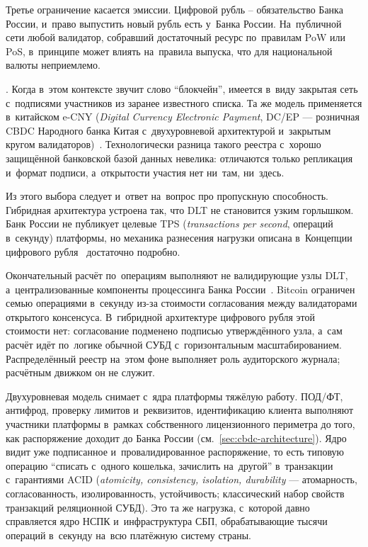 Третье ограничение касается эмиссии. Цифровой рубль -- обязательство
Банка России, и~право выпустить новый рубль есть у~Банка России.
На~публичной сети любой валидатор, собравший достаточный ресурс
по~правилам PoW или PoS, в~принципе может влиять на~правила выпуска,
что для национальной валюты неприемлемо.

. Когда в~этом контексте звучит слово
\enquote{блокчейн}, имеется в~виду закрытая сеть с~подписями участников
из заранее известного списка. Та же модель применяется в~китайском e-CNY (\textit{Digital Currency
Electronic Payment}, DC/EP --- розничная CBDC Народного банка
Китая с~двухуровневой архитектурой и~закрытым кругом
валидаторов)~\cite{pboc-ecny-2021}.
Технологически разница такого реестра с~хорошо защищённой банковской
базой данных невелика: отличаются только репликация
и~формат подписи, а~открытости участия нет ни~там, ни~здесь.

Из этого выбора следует и~ответ на~вопрос про пропускную способность.
Гибридная архитектура устроена так, что DLT не становится узким горлышком.
Банк России не публикует целевые TPS (\textit{transactions per second},
операций в~секунду) платформы, но механика разнесения
нагрузки описана в~Концепции цифрового рубля~\cite{cbr-concept-2021}
достаточно подробно.

Окончательный расчёт по~операциям выполняют не валидирующие
узлы DLT, а~централизованные компоненты процессинга Банка
России~\cite{cbr-concept-2021}. Bitcoin ограничен семью операциями
в~секунду из-за стоимости согласования между валидаторами открытого
консенсуса. В~гибридной архитектуре цифрового рубля этой стоимости
нет: согласование подменено подписью утверждённого узла,
а~сам расчёт идёт по~логике обычной СУБД с~горизонтальным
масштабированием. Распределённый реестр на~этом фоне выполняет роль
аудиторского журнала; расчётным движком он не служит.

Двухуровневая модель снимает с~ядра платформы тяжёлую работу. ПОД/ФТ,
антифрод, проверку лимитов и~реквизитов, идентификацию клиента
выполняют участники платформы в~рамках собственного
лицензионного периметра до того, как распоряжение доходит до Банка
России (см.\ \autoref{sec:cbdc-architecture}).
Ядро видит уже подписанное и~провалидированное распоряжение, то есть
типовую операцию \enquote{списать с~одного кошелька, зачислить
на~другой} в~транзакции с~гарантиями ACID (\textit{atomicity,
consistency, isolation, durability} --- атомарность, согласованность,
изолированность, устойчивость; классический набор свойств транзакций
реляционной СУБД). Это та же нагрузка, с~которой давно
справляется ядро НСПК и~инфраструктура СБП, обрабатывающие тысячи операций
в~секунду на~всю платёжную систему страны.

